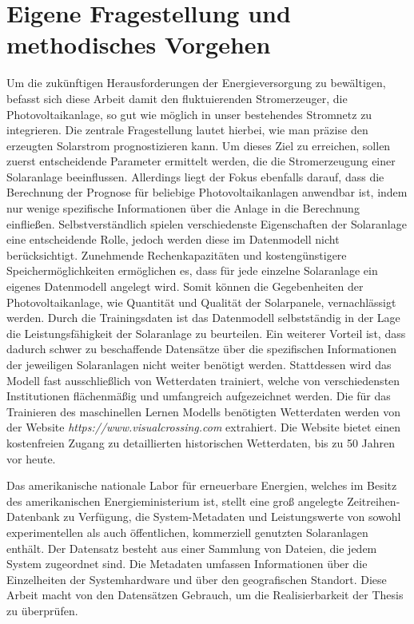 \documentclass[12pt, a4paper]{article}
\begin{document}
\newpage

\section{Eigene Fragestellung und methodisches Vorgehen}

Um die zukünftigen Herausforderungen der Energieversorgung zu bewältigen, befasst sich diese Arbeit damit den fluktuierenden Stromerzeuger, die Photovoltaikanlage, so gut wie möglich in unser bestehendes Stromnetz zu integrieren. Die zentrale Fragestellung lautet hierbei, wie man präzise den erzeugten Solarstrom prognostizieren kann. Um dieses Ziel zu erreichen, sollen zuerst entscheidende Parameter ermittelt werden, die die Stromerzeugung einer Solaranlage beeinflussen. Allerdings liegt der Fokus ebenfalls darauf, dass die Berechnung der Prognose für beliebige Photovoltaikanlagen anwendbar ist, indem nur wenige spezifische Informationen über die Anlage in die Berechnung einfließen. Selbstverständlich spielen verschiedenste Eigenschaften der Solaranlage eine entscheidende Rolle, jedoch werden diese im Datenmodell nicht berücksichtigt. Zunehmende Rechenkapazitäten und kostengünstigere Speichermöglichkeiten ermöglichen es, dass für jede einzelne Solaranlage ein eigenes Datenmodell angelegt wird. Somit können die Gegebenheiten der Photovoltaikanlage, wie Quantität und Qualität der Solarpanele, vernachlässigt werden. Durch die Trainingsdaten ist das Datenmodell selbstständig in der Lage die Leistungsfähigkeit der Solaranlage zu beurteilen. Ein weiterer Vorteil ist, dass dadurch schwer zu beschaffende Datensätze über die spezifischen Informationen der jeweiligen Solaranlagen nicht weiter benötigt werden. Stattdessen wird das Modell fast ausschließlich von Wetterdaten trainiert, welche von verschiedensten Institutionen flächenmäßig und umfangreich aufgezeichnet werden. Die für das Trainieren des maschinellen Lernen Modells benötigten Wetterdaten werden von der Website \textit{https://www.visualcrossing.com} extrahiert. Die Website bietet einen kostenfreien Zugang zu detaillierten historischen Wetterdaten, bis zu 50 Jahren vor heute. 

Das amerikanische nationale Labor für erneuerbare Energien, welches im Besitz des amerikanischen Energieministerium ist, stellt eine groß angelegte Zeitreihen-Datenbank zu Verfügung, die System-Metadaten und Leistungswerte von sowohl experimentellen als auch öffentlichen, kommerziell genutzten Solaranlagen enthält.  Der Datensatz besteht aus einer Sammlung von Dateien, die jedem System zugeordnet sind. Die Metadaten umfassen Informationen über die Einzelheiten der Systemhardware und über den geografischen Standort. Diese Arbeit macht von den Datensätzen Gebrauch, um die Realisierbarkeit der Thesis zu überprüfen. 
\end{document}
